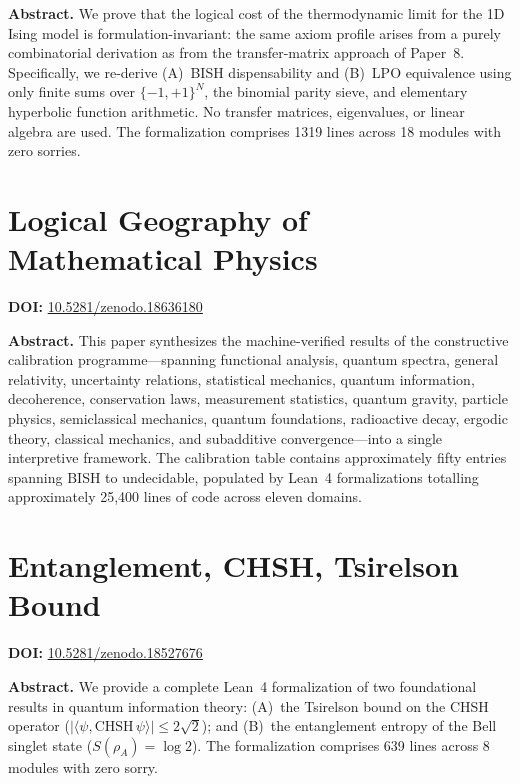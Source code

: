 \documentclass[11pt,a4paper]{article}
\begin{document}
\bigskip
\noindent\textbf{Abstract.}
We prove that the logical cost of the thermodynamic limit for the 1D Ising model is formulation-invariant: the same axiom profile arises from a purely combinatorial derivation as from the transfer-matrix approach of Paper~8. Specifically, we re-derive (A)~BISH dispensability and (B)~LPO equivalence using only finite sums over $\{-1,+1\}^N$, the binomial parity sieve, and elementary hyperbolic function arithmetic. No transfer matrices, eigenvalues, or linear algebra are used. The formalization comprises 1319 lines across 18 modules with zero sorries.

\section{Logical Geography of Mathematical Physics}
\label{sec:p10}
\textbf{DOI:} \href{https://doi.org/10.5281/zenodo.18636180}{10.5281/zenodo.18636180}

\bigskip
\noindent\textbf{Abstract.}
This paper synthesizes the machine-verified results of the constructive calibration programme---spanning functional analysis, quantum spectra, general relativity, uncertainty relations, statistical mechanics, quantum information, decoherence, conservation laws, measurement statistics, quantum gravity, particle physics, semiclassical mechanics, quantum foundations, radioactive decay, ergodic theory, classical mechanics, and subadditive convergence---into a single interpretive framework. The calibration table contains approximately fifty entries spanning BISH to undecidable, populated by Lean~4 formalizations totalling approximately 25,400 lines of code across eleven domains.

\section{Entanglement, CHSH, Tsirelson Bound}
\label{sec:p11}
\textbf{DOI:} \href{https://doi.org/10.5281/zenodo.18527676}{10.5281/zenodo.18527676}

\bigskip
\noindent\textbf{Abstract.}
We provide a complete Lean~4 formalization of two foundational results in quantum information theory: (A)~the Tsirelson bound on the CHSH operator ($|\langle\psi,\mathrm{CHSH}\,\psi\rangle|\le 2\sqrt{2}$); and (B)~the entanglement entropy of the Bell singlet state ($S(\rho_A)=\log 2$). The formalization comprises 639 lines across 8 modules with zero sorry.
\end{document}
